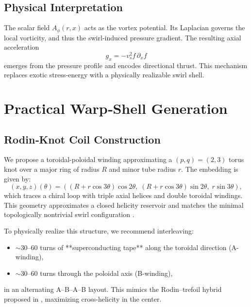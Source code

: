 \documentclass[preprint,notitlepage]{revtex4-2}
\begin{document}
    \subsection{Physical Interpretation}
    The scalar field $A_\phi(r,x)$ acts as the vortex potential. Its Laplacian governs the local vorticity, and thus the swirl‐induced pressure gradient. The resulting axial acceleration
    \begin{equation}
      g_x = -v_s^2 f \, \partial_x f
    \end{equation}
    emerges from the pressure profile and encodes directional thrust. This mechanism replaces exotic stress‐energy with a physically realizable swirl shell.

\section{Practical Warp‐Shell Generation}
    
    \subsection{Rodin‐Knot Coil Construction}
    
    We propose a toroidal-poloidal winding approximating a $(p,q) = (2,3)$ torus knot over a major ring of radius $R$ and minor tube radius $r$. The embedding is given by:
    \begin{equation}
    (x, y, z)(\theta) = \left( (R + r\cos 3\theta)\cos 2\theta,\; (R + r\cos 3\theta)\sin 2\theta,\; r\sin 3\theta \right),
    \end{equation}
    which traces a chiral loop with triple axial helices and double toroidal windings. This geometry approximates a closed helicity reservoir and matches the minimal topologically nontrivial swirl configuration \cite{VAM-10}.
    
    To physically realize this structure, we recommend interleaving:
    \begin{itemize}
        \item $\sim$30–60 turns of **superconducting tape** along the toroidal direction (A-winding),
        \item $\sim$30–60 turns through the poloidal axis (B-winding),
    \end{itemize}
    in an alternating A–B–A–B layout. This mimics the Rodin–trefoil hybrid proposed in \cite{VAM-6, VAM-10}, maximizing cross-helicity in the center.
    
\end{document}
